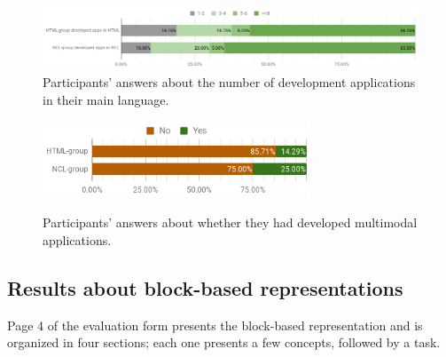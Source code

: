 \begin{figure}[!ht]
\begin{center}
	\includegraphics[width=14cm, keepaspectratio]{img/img18.png}
	\caption{Participants’ answers about the number of development applications
	in their main language.}
	\label{fig:profile3}
    \captionvspace
\end{center}
\end{figure}


\begin{figure}[!ht]
\begin{center}
	\includegraphics[width=8cm, keepaspectratio]{img/img19.png}
	\caption{Participants’ answers about whether they had developed multimodal
	applications.}
    \captionvspace
	\label{fig:profile4}
\end{center}
\end{figure}

\subsection{Results about block-based representations}
\label{sec:evaluation:blocks-res}

Page 4 of the evaluation form presents the block-based representation and is
organized in four sections; each one presents a few concepts, followed by a
task.

